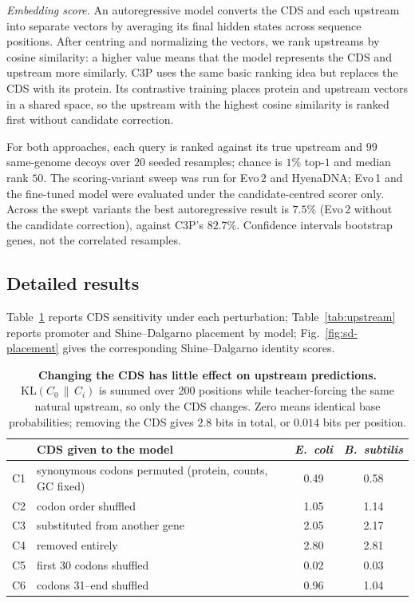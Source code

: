 \documentclass{article}
\newcommand{\rev}[1]{\begingroup\color{red}#1\endgroup}
\begin{document}
\emph{Embedding score.} An autoregressive model converts the CDS and each upstream
into separate vectors by averaging its final hidden states across sequence
positions. After centring and normalizing the vectors, we rank upstreams by cosine
similarity: a higher value means that the model represents the CDS and upstream
more similarly. C3P uses the same basic ranking idea but replaces the CDS with its
protein. Its contrastive training places protein and upstream vectors in a shared
space, so the upstream with the highest cosine similarity is ranked first without
candidate correction.

For both approaches, each query is ranked against its true upstream and $99$
same-genome decoys over $20$ seeded resamples; chance is $1\%$ top-$1$ and median
rank $50$. \rev{The scoring-variant sweep was run for Evo\,2 and HyenaDNA; Evo\,1
and the fine-tuned model were evaluated under the candidate-centred scorer only.
Across the swept variants the best autoregressive result is $7.5\%$ (Evo\,2
without the candidate correction), against C3P's $82.7\%$.} Confidence intervals bootstrap genes, not the
correlated resamples.

\subsection{Detailed results}

Table~\ref{tab:kl} reports CDS sensitivity under each perturbation;
Table~\ref{tab:upstream} reports promoter and Shine--Dalgarno placement by model;
Fig.~\ref{fig:sd-placement} gives the corresponding Shine--Dalgarno identity
scores.

\begin{table}[htbp]
  \centering
  \small
  \caption{\textbf{Changing the CDS has little effect on upstream predictions.}
  $\mathrm{KL}(C_0\,\|\,C_i)$ is summed over 200 positions while teacher-forcing
  the same natural upstream, so only the CDS changes. Zero means identical base
  probabilities; removing the CDS gives $2.8$ bits in total, or $0.014$ bits per
  position.}
  \label{tab:kl}
  \begin{tabular}{@{}llcc@{}}
    \toprule
    & CDS given to the model & \emph{E.~coli} & \emph{B.~subtilis} \\
    \midrule
    C1 & synonymous codons permuted (protein, counts, GC fixed) & 0.49 & 0.58 \\
    C2 & codon order shuffled                                   & 1.05 & 1.14 \\
    C3 & substituted from another gene                          & 2.05 & 2.17 \\
    C4 & removed entirely                                       & 2.80 & 2.81 \\
    C5 & first 30 codons shuffled                               & 0.02 & 0.03 \\
    C6 & codons 31--end shuffled                                & 0.96 & 1.04 \\
    \bottomrule
  \end{tabular}
\end{table}
\end{document}
